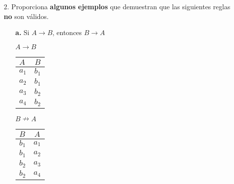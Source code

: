 \documentclass[12pt, letterpaper]{article}
\begin{document}
\begin{itemize}
\begin{itemize}
\begin{itemize}
                                    \end{itemize}

            \end{itemize}
        \newpage
        \item[2.]   Proporciona \textbf{algunos ejemplos} que demuestran que las 
                    siguientes reglas \textbf{no} son válidos.

            \begin{itemize}
                
                \item[\textbf{a.}]  Si $A \rightarrow B$, 
                                    entonces $B \rightarrow A$
                                
                                \begin{multicols}{2}
                                    
                                    $A \rightarrow B$
                                        \begin{tabular}{| l | c | }
                                            \hline
                                            $A$ & $B$ \\
                                            \hline 
                                            $a_{1}$ & $b_{1}$ \\
                                            $a_{2}$ & $b_{1}$ \\
                                            $a_{3}$ & $b_{2}$ \\
                                            $a_{4}$ & $b_{2}$ \\
                                            \hline
                                        \end{tabular}
                                        
                                        $B \nrightarrow A$
                                        \begin{tabular}{| l | c | }
                                            \hline
                                            $B$ & $A$ \\
                                            \hline 
                                            $b_{1}$ & $a_{1}$ \\
                                            $b_{1}$ & $a_{2}$ \\
                                            $b_{2}$ & $a_{3}$ \\
                                            $b_{2}$ & $a_{4}$ \\
                                            \hline
                                        \end{tabular}


\end{multicols}
\end{itemize}
\end{itemize}
\end{document}
